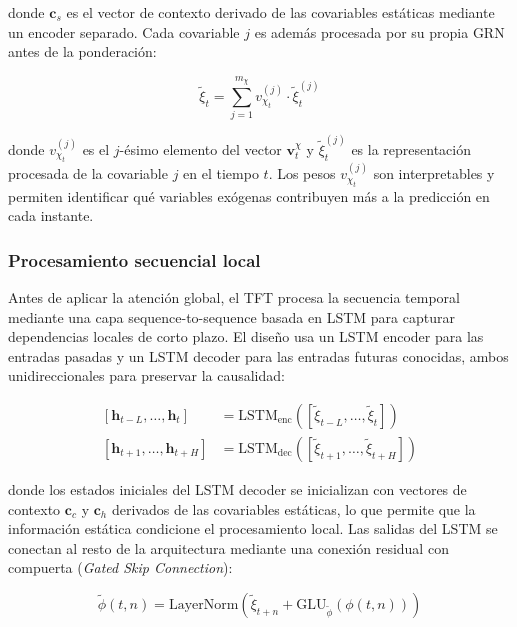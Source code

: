 donde $\mathbf{c}_s$ es el vector de contexto derivado de las covariables estáticas mediante un encoder separado. Cada covariable $j$ es además procesada por su propia GRN antes de la ponderación:

\begin{equation}
\tilde{\xi}_t = \sum_{j=1}^{m_\chi} v^{(j)}_{\chi_t} \cdot \tilde{\xi}^{(j)}_t
\end{equation}

donde $v^{(j)}_{\chi_t}$ es el $j$-ésimo elemento del vector $\mathbf{v}^\chi_t$ y $\tilde{\xi}^{(j)}_t$ es la representación procesada de la covariable $j$ en el tiempo $t$. Los pesos $v^{(j)}_{\chi_t}$ son interpretables y permiten identificar qué variables exógenas contribuyen más a la predicción en cada instante.

\subsubsection{Procesamiento secuencial local}

Antes de aplicar la atención global, el TFT procesa la secuencia temporal mediante una capa sequence-to-sequence basada en LSTM para capturar dependencias locales de corto plazo. El diseño usa un LSTM encoder para las entradas pasadas y un LSTM decoder para las entradas futuras conocidas, ambos unidireccionales para preservar la causalidad:

\begin{align}
    \left[\mathbf{h}_{t-L}, \ldots, \mathbf{h}_t\right] &= \text{LSTM}_{\text{enc}}\left(\left[\tilde{\xi}_{t-L}, \ldots, \tilde{\xi}_t\right]\right) \\
    \left[\mathbf{h}_{t+1}, \ldots, \mathbf{h}_{t+H}\right] &= \text{LSTM}_{\text{dec}}\left(\left[\tilde{\xi}_{t+1}, \ldots, \tilde{\xi}_{t+H}\right]\right)
\end{align}

donde los estados iniciales del LSTM decoder se inicializan con vectores de contexto $\mathbf{c}_c$ y $\mathbf{c}_h$ derivados de las covariables estáticas, lo que permite que la información estática condicione el procesamiento local. Las salidas del LSTM se conectan al resto de la arquitectura mediante una conexión residual con compuerta (\textit{Gated Skip Connection}):

\begin{equation}
\tilde{\phi}(t, n) = \text{LayerNorm}\!\left(\tilde{\xi}_{t+n} + \text{GLU}_{\tilde{\phi}}\!\left(\phi(t, n)\right)\right)
\end{equation}

